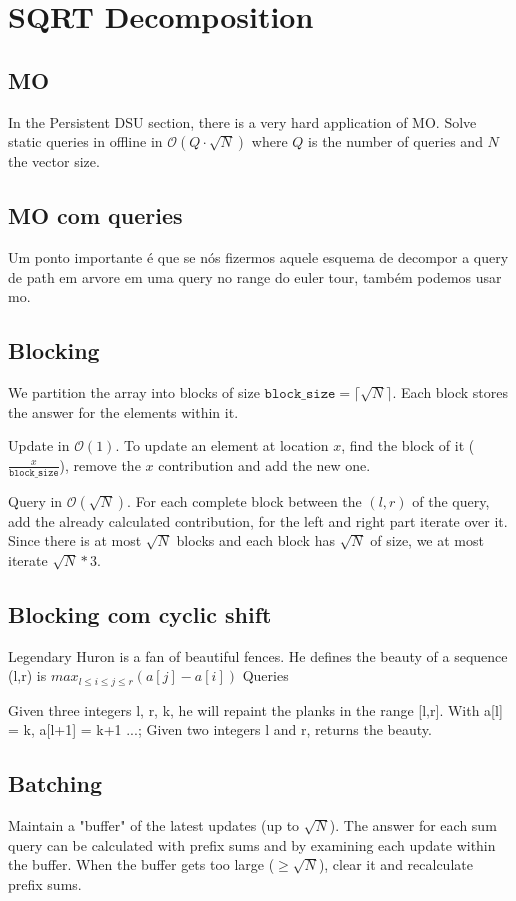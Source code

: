 \section{SQRT Decomposition}

\subsection{MO}

In the Persistent DSU section, there is a very hard application of MO. Solve static queries in offline in $\mathcal{O}(Q\cdot \sqrt{N})$ where $Q$ is the number of queries and $N$ the vector size.

\subsection{MO com queries}

Um ponto importante é que se nós fizermos aquele esquema de decompor a query de path em arvore em uma query no range do euler tour, também podemos usar mo. 

\subsection{Blocking}
We partition the array into blocks of size $\texttt{block\_size}=\lceil \sqrt{N} \rceil$. Each block stores the answer for the elements within it.

Update in $\mathcal{O}(1)$. To update an element at location $x$, find the block of it ($\frac{x}{\texttt{block\_size}}$), remove the $x$ contribution and add the new one.

Query in $\mathcal{O}(\sqrt{N})$. For each complete block between the $(l,r)$ of the query, add the already calculated contribution, for the left and right part iterate over it.
Since there is at most $\sqrt{N}$ blocks and each block has $\sqrt{N}$ of size, we at most iterate $\sqrt{N}*3$.

\subsection{Blocking com cyclic shift}
Legendary Huron is a fan of beautiful fences. He defines the beauty of a sequence (l,r) is $max_{l \leq i \leq j \leq r}(a[j]-a[i])$
Queries

Given three integers l, r, k, he will repaint the planks in the range [l,r]. With a[l] = k, a[l+1] = k+1 ...;
Given two integers l and r, returns the beauty.

\subsection{Batching}
Maintain a "buffer" of the latest updates (up to $\sqrt N$). The answer for each
sum query can be calculated with prefix sums and by examining each update within
the buffer. When the buffer gets too large ($\ge \sqrt N$), clear it and
recalculate prefix sums.

